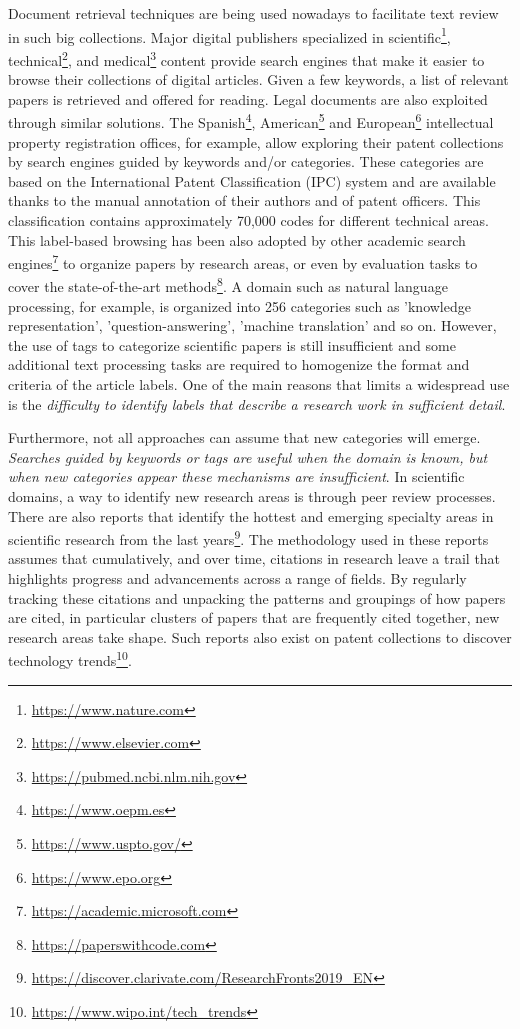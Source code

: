 Document retrieval techniques are being used nowadays to facilitate text review in such big collections. Major digital publishers specialized in scientific\footnote{\url{https://www.nature.com}}, technical\footnote{\url{https://www.elsevier.com}}, and medical\footnote{\url{https://pubmed.ncbi.nlm.nih.gov}} content provide search engines that make it easier to browse their collections of digital articles. Given a few keywords, a list of relevant papers is retrieved and offered for reading. Legal documents are also exploited through similar solutions. The Spanish\footnote{\url{https://www.oepm.es}}, American\footnote{\url{https://www.uspto.gov/}} and European\footnote{\url{https://www.epo.org}} intellectual property registration offices, for example, allow exploring their patent collections by search engines guided by keywords and/or categories. These categories are based on the International Patent Classification (IPC) system and are available thanks to the manual annotation of their authors and of patent officers. This classification contains approximately 70,000 codes for different technical areas. This label-based browsing has been also adopted by other academic search engines\footnote{\url{https://academic.microsoft.com}} to organize papers by research areas, or even by evaluation tasks to cover the state-of-the-art methods\footnote{\url{https://paperswithcode.com}}. A domain such as natural language processing, for example, is organized into 256 categories such as 'knowledge representation', 'question-answering', 'machine translation' and so on. However, the use of tags to categorize scientific papers is still insufficient and some additional text processing tasks are required to homogenize the format and criteria of the article labels. One of the main reasons that limits a widespread use is the \textit{difficulty to identify labels that describe a research work in sufficient detail}.

Furthermore, not all approaches can assume that new categories will emerge. \textit{Searches guided by keywords or tags are useful when the domain is known, but when new categories appear these mechanisms are insufficient}. In scientific domains, a way to identify new research areas is through peer review processes. There are also reports that identify the hottest and emerging specialty areas in scientific research from the last years\footnote{\url{https://discover.clarivate.com/ResearchFronts2019_EN}}. The methodology used in these reports assumes that cumulatively, and over time, citations in research leave a trail that highlights progress and advancements across a range of fields. By regularly tracking these citations and unpacking the patterns and groupings of how papers are cited, in particular clusters of papers that are frequently cited together, new research areas take shape. Such reports also exist on patent collections to discover technology trends\footnote{\url{https://www.wipo.int/tech_trends}}.

